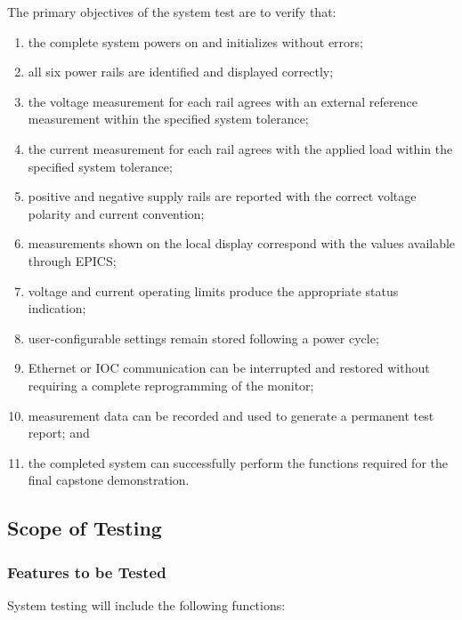 The primary objectives of the system test are to verify that:

\begin{enumerate}
	\item the complete system powers on and initializes without errors;
	\item all six power rails are identified and displayed correctly;
	\item the voltage measurement for each rail agrees with an external reference
	measurement within the specified system tolerance;
	\item the current measurement for each rail agrees with the applied load within
	the specified system tolerance;
	\item positive and negative supply rails are reported with the correct voltage
	polarity and current convention;
	\item measurements shown on the local display correspond with the values available
	through EPICS;
	\item voltage and current operating limits produce the appropriate status indication;
	\item user-configurable settings remain stored following a power cycle;
	\item Ethernet or IOC communication can be interrupted and restored without
	requiring a complete reprogramming of the monitor;
	\item measurement data can be recorded and used to generate a permanent test report;
	and
	\item the completed system can successfully perform the functions required for
	the final capstone demonstration.
\end{enumerate}

\subsection{Scope of Testing}

\subsubsection{Features to be Tested}

System testing will include the following functions:

